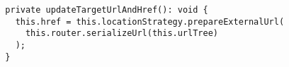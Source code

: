 \begin{verbatim}
  private updateTargetUrlAndHref(): void {
    this.href = this.locationStrategy.prepareExternalUrl(
      this.router.serializeUrl(this.urlTree)
    );
  }
\end{verbatim}
